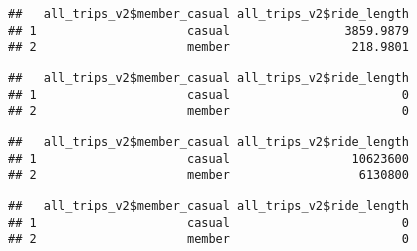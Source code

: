 \documentclass[
]{article}
\newenvironment{Shaded}{\begin{snugshade}}{\end{snugshade}}
\newcommand{\AttributeTok}[1]{\textcolor[rgb]{0.13,0.29,0.53}{#1}}
\newcommand{\FunctionTok}[1]{\textcolor[rgb]{0.13,0.29,0.53}{\textbf{#1}}}
\newcommand{\NormalTok}[1]{#1}
\newcommand{\SpecialCharTok}[1]{\textcolor[rgb]{0.81,0.36,0.00}{\textbf{#1}}}
\begin{document}
\begin{verbatim}
##   all_trips_v2$member_casual all_trips_v2$ride_length
## 1                     casual                3859.9879
## 2                     member                 218.9801
\end{verbatim}

\begin{Shaded}
\end{Shaded}

\begin{verbatim}
##   all_trips_v2$member_casual all_trips_v2$ride_length
## 1                     casual                        0
## 2                     member                        0
\end{verbatim}

\begin{Shaded}
\end{Shaded}

\begin{verbatim}
##   all_trips_v2$member_casual all_trips_v2$ride_length
## 1                     casual                 10623600
## 2                     member                  6130800
\end{verbatim}

\begin{Shaded}
\end{Shaded}

\begin{verbatim}
##   all_trips_v2$member_casual all_trips_v2$ride_length
## 1                     casual                        0
## 2                     member                        0
\end{verbatim}
\end{document}
